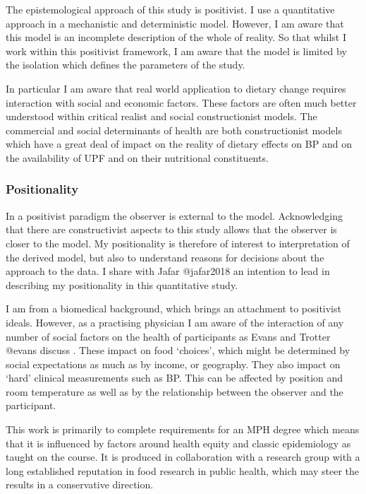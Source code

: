 \documentclass[
]{article}
\begin{document}
The epistemological approach of this study is positivist. I use a
quantitative approach in a mechanistic and deterministic model. However,
I am aware that this model is an incomplete description of the whole of
reality. So that whilst I work within this positivist framework, I am
aware that the model is limited by the isolation which defines the
parameters of the study.

In particular I am aware that real world application to dietary change
requires interaction with social and economic factors. These factors are
often much better understood within critical realist and social
constructionist models. The commercial and social determinants of health
are both constructionist models which have a great deal of impact on the
reality of dietary effects on BP and on the availability of UPF and on
their nutritional constituents.

\hypertarget{positionality}{%
\subsubsection{Positionality}\label{positionality}}

In a positivist paradigm the observer is external to the model.
Acknowledging that there are constructivist aspects to this study allows
that the observer is closer to the model. My positionality is therefore
of interest to interpretation of the derived model, but also to
understand reasons for decisions about the approach to the data. I share
with Jafar @jafar2018 an intention to lead in describing my
positionality in this quantitative study.

I am from a biomedical background, which brings an attachment to
positivist ideals. However, as a practising physician I am aware of the
interaction of any number of social factors on the health of
participants as Evans and Trotter @evans discuss . These impact on food
`choices', which might be determined by social expectations as much as
by income, or geography. They also impact on `hard' clinical
measurements such as BP. This can be affected by position and room
temperature as well as by the relationship between the observer and the
participant.

This work is primarily to complete requirements for an MPH degree which
means that it is influenced by factors around health equity and classic
epidemiology as taught on the course. It is produced in collaboration
with a research group with a long established reputation in food
research in public health, which may steer the results in a conservative
direction.
\end{document}
